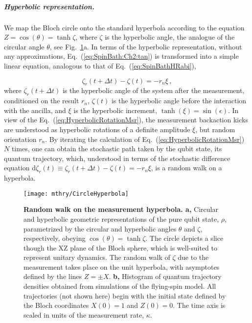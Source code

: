 \subparagraph{Hyperbolic representation.}

We map the Bloch circle onto the standard hyperbola according to the
equation $Z=\cos\left(\theta\right)=\tanh\zeta$, where $\zeta$ is
the hyperbolic angle, the analogue of the circular angle $\theta$,
see Fig.~\ref{fig:Random-walk-on-hyperb}a. In terms of the hyperbolic
representation, without any approximations, Eq.~(\ref{eq:SpinBath:Ch2:tan})
is transformed into a simple linear equation, analogous to that of
Eq.~(\ref{eq:SpinBathHRabi}), 

\begin{equation}
\zeta_{r}\left(t+\Delta t\right)-\zeta\left(t\right)=-r_{n}\xi\,,\label{eq:HyperbolicRotationMsr}
\end{equation}
where $\zeta_{r}\left(t+\Delta t\right)$ is the hyperbolic angle
of the system after the measurement, conditioned on the result $r_{n}$,
$\zeta\left(t\right)$ is the hyperbolic angle before the interaction
with the ancilla, and $\xi$ is the hyperbolic increment, $\tanh\left(\xi\right)=\sin\left(\epsilon\right)$.
In view of the Eq.~(\ref{eq:HyperbolicRotationMsr}), the measurement
backaction kicks are understood as hyperbolic rotations of a definite
amplitude $\xi$, but random orientation $r_{n}$. By iterating the
calculation of Eq.~(\ref{eq:HyperbolicRotationMsr}) $N$ times,
one can obtain the stochastic path taken by the qubit state, its  quantum
trajectory, which, understood in terms of the stochastic difference
equation $\mathrm{d}\zeta_{r}\left(t\right)\equiv\zeta_{r}\left(t+\Delta t\right)-\zeta\left(t\right)=-r_{n}\xi$,
is a random walk on a hyperbola.

\begin{figure}
\begin{centering}
\texttt{[image: mthry/CircleHyperbola]}
\par\end{centering}
\caption[Random walk on the measurement hyperbola.]{\textbf{Random walk on the measurement hyperbola.\label{fig:Random-walk-on-hyperb}
a,} Circular and hyperbolic geometric representations of the pure
qubit state, $\rho$, parametrized by the circular and hyperbolic
angles $\theta$ and $\zeta$, respectively, obeying $\cos\left(\theta\right)=\tanh\zeta$.
The circle depicts a slice though the XZ plane of the Bloch sphere,
which is well-suited to represent unitary dynamics. The random walk
of $\zeta$ due to the measurement takes place on the unit hyperbola,
with asymptotes defined by the lines $Z=\pm X$. \textbf{b,} Histogram
of quantum trajectory densities obtained from simulations of the flying-spin
model. All trajectories (not shown here) begin with the initial state
defined by the Bloch coordinates $X\left(0\right)=1$ and $Z\left(0\right)=0$.
The time axis is scaled in units of the measurement rate, $\kappa$.
}
\end{figure}

